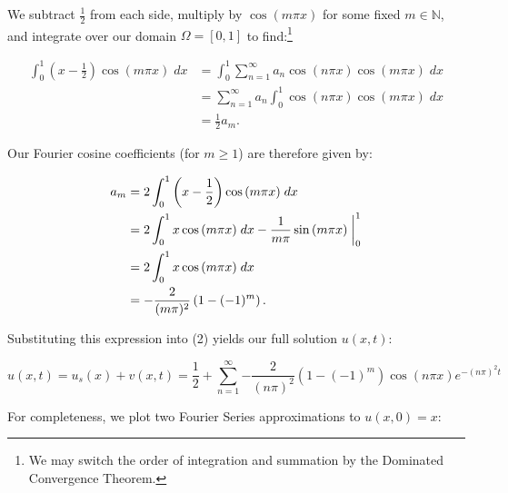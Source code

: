 \begin{solution}
    We subtract $\frac{1}{2}$ from each side, multiply by $\cos{(m \pi x)}$ for some fixed $m \in \mathbb{N}$, and 
    integrate over our domain $\Omega = [0, 1]$ to find:\footnote{
        We may switch the order of integration and summation by the Dominated Convergence Theorem.
    }

    \begin{align*}
        \int_{0}^{1}{\left(x - \frac{1}{2}\right) \cos{(m \pi x)}\; dx}
            &= \int_{0}^{1}{\sum\limits_{n=1}^{\infty}{a_n \cos{(n \pi x)} \cos{(m \pi x)} }\; dx} \\
            &= \sum\limits_{n=1}^{\infty}{a_n \int_{0}^{1}{\cos{(n \pi x)} \cos{(m \pi x)}\; dx }} \\
            &= \frac{1}{2} a_m.
    \end{align*}

    Our Fourier cosine coefficients (for $m \ge 1$) are therefore given by:

    \begin{alignat*}{2}
        a_m &= 2 \int_{0}^{1}{\left( x - \frac{1}{2} \right) \cos{(m \pi x)}\; dx} \\
            &= 2 \int_{0}^{1}{x \cos{(m \pi x)}\; dx} - \frac{1}{m \pi} \sin{(m \pi x)} \biggm\rvert_{0}^{1} \\
            &= 2 \int_{0}^{1}{x \cos{(m \pi x)}\; dx} \\
            &= -\frac{2}{(m \pi)^2} \left(1 - (-1)^{m}\right).
    \end{alignat*}

    Substituting this expression into (2) yields our full solution $u(x, t)$:
    
    $$
    u(x, t) = u_s(x) + v(x, t) 
            = \frac{1}{2} + \sum\limits_{n=1}^{\infty}{-\frac{2}{(n \pi)^2} \left(1 - (-1)^{m}\right) \cos{(n \pi x)} e^{-(n \pi)^2 t}}
    $$

    For completeness, we plot two Fourier Series approximations to $u(x, 0) = x$:


\end{solution}
